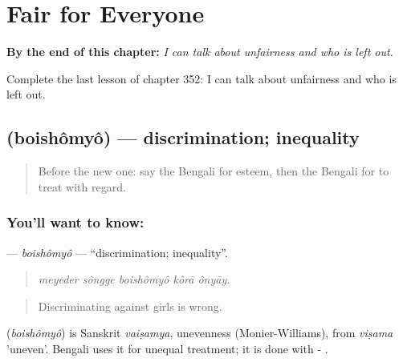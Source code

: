 
\chapter{Fair for Everyone}
\label{ch:bn-fair-for-everyone}

\begin{chapteropening}
\textbf{By the end of this chapter:} \emph{I can talk about unfairness and who is left out.}

Complete the last lesson of chapter 352: I can talk about unfairness and who is left out.
\end{chapteropening}

\section[\texorpdfstring{\bn{বৈষম্য} (boishômyô)}{বৈষম্য (boishômyô)}]{ (boishômyô) — discrimination; inequality}

\label{lesson:BN-C352-boishomyo}



\begin{quote}
Before the new one: say the Bengali for esteem, then the Bengali for to treat with regard.
\end{quote}

\subsection*{You'll want to know: }
\textbf{} — \emph{boishômyô} — \textquotedblleft{}discrimination; inequality\textquotedblright{}.

\begin{quote}
    
\end{quote}

\begin{quote}
\emph{meyeder sôngge boishômyô kôrā ônyāy.}
\end{quote}

\begin{quote}
Discriminating against girls is wrong.
\end{quote}

\begin{cousinweb}
\textbf{} (\emph{boishômyô}) is Sanskrit \emph{vaiṣamya}, unevenness (Monier-Williams), from \emph{viṣama} 'uneven'. Bengali uses it for unequal treatment; it is done with - .
\end{cousinweb}

